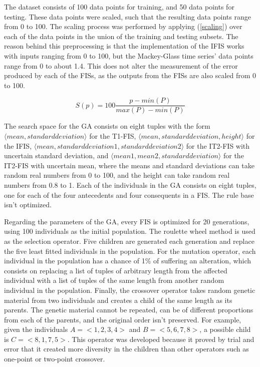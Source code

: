 \documentclass[conference]{IEEEtran}
\begin{document}
The dataset consists of 100 data points for training, and 50 data
points for testing. These data points were scaled, such that the
resulting data points range from 0 to 100. The scaling process was
performed by applying (\ref{scaling}) over each of the data points in
the union of the training and testing subsets. The reason behind this
preprocessing is that the implementation of the IFIS works with inputs
ranging from 0 to 100, but the Mackey-Glass time series' data points
range from 0 to about 1.4. This does not alter the measurement of the
error produced by each of the FISs, as the outputs from the FISs are
also scaled from 0 to 100.

\begin{equation}
  \label{scaling}
  S(p) = 100 \frac{p - min(P)}{max(P) - min(P)}
\end{equation}

The search space for the GA consists on eight tuples with the form $\langle
mean, standard deviation \rangle$ for the T1-FIS, $\langle
mean, standard deviation, height \rangle$ for the IFIS, $\langle
mean, standard deviation 1, standard deviation 2 \rangle$ for the
IT2-FIS with uncertain standard deviation, and $\langle
mean 1, mean 2, standard deviation \rangle$ for the IT2-FIS with
uncertain mean, where the means and standard deviations can take
random real numbers from 0 to 100, and the height can take random real
numbers from 0.8 to 1. Each of the individuals in the GA consists on
eight tuples, one for each of the four antecedents and four
consequents in a FIS. The rule base isn't optimized.

Regarding the parameters of the GA, every FIS is optimized for 20
generations, using 100 individuals as the initial population. The
roulette wheel method is used as the selection operator. Five
children are generated each generation and replace the five least
fitted individuals in the population. For the mutation operator, each
individual in the population has a chance of 1\% of suffering an
alteration, which consists on replacing a list of tuples of arbitrary
length from the affected individual with a list of tuples of the same
length from another random individual in the population. Finally, the
crossover operator takes random genetic material from two individuals
and creates a child of the same length as its parents. The genetic
material cannot be repeated, can be of different proportions from each
of the parents, and the original order isn't preserved. For example,
given the individuals $A = <1, 2, 3, 4>$ and $B = <5, 6, 7, 8>$, a
possible child is $C = <8, 1, 7, 5>$. This operator was developed
because it proved by trial and error that it created more diversity in
the children than other operators such as one-point or two-point
crossover.
\end{document}

